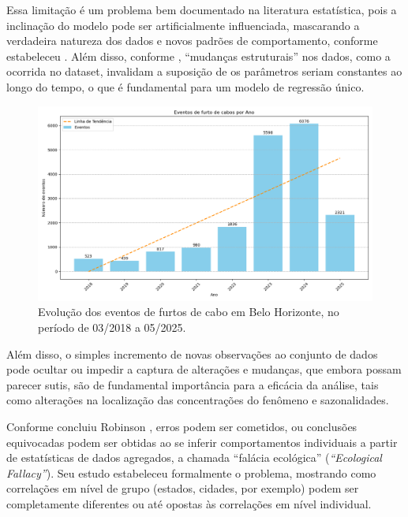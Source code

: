 Essa limitação é um problema bem documentado na literatura estatística, pois a inclinação do modelo pode ser artificialmente influenciada, mascarando a verdadeira natureza dos dados e novos padrões de comportamento, conforme estabeleceu \cite{Anscombe1973}. Além disso, conforme \cite{Gujarati2011}, ``mudanças estruturais'' nos dados, como a ocorrida no dataset, invalidam a suposição de os parâmetros seriam constantes ao longo do tempo, o que é fundamental para um modelo de regressão único.

\begin{figure}[!htb]
  \captionsetup{singlelinecheck=false}
  \centering
  \includegraphics[scale=0.5,keepaspectratio]{dados/images/grafico_barras_ocorrencias_ano.png}
  \caption{Evolução dos eventos de furtos de cabo em Belo Horizonte, no período de 03/2018 a 05/2025.}
  \label{fig:grafico_barras_ocorrencias_ano}
\end{figure}

Além disso, o simples incremento de novas observações ao conjunto de dados pode ocultar ou impedir a captura de alterações e mudanças, que embora possam parecer sutis, são de fundamental importância para a eficácia da análise, tais como alterações na localização das concentrações do fenômeno e sazonalidades.

Conforme concluiu Robinson \cite{Robinson1950}, erros podem ser cometidos, ou conclusões equivocadas podem ser obtidas ao se inferir comportamentos individuais a partir de estatísticas de dados agregados, a chamada ``falácia ecológica'' (\textit{``Ecological Fallacy''}). Seu estudo estabeleceu formalmente o problema, mostrando como correlações em nível de grupo (estados, cidades, por exemplo) podem ser completamente diferentes ou até opostas às correlações em nível individual.


